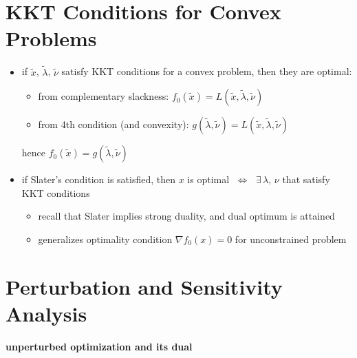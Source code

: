 \documentclass[11pt]{extarticle}
\newcommand{\ds}{\displaystyle}
\newcommand{\ifff}{\;\Longleftrightarrow\;}
\theoremstyle{definition}
\begin{document}
\newpage

\section*{KKT Conditions for Convex Problems}
\begin{itemize}
  \item if $\widetilde{x}$, $\widetilde{\lambda}$, $\widetilde{\nu}$ satisfy KKT conditions for a convex problem, then they are optimal:
    \begin{itemize}
      \item from complementary slackness: $\ds f_0(\widetilde{x}) = L(\widetilde{x}, \widetilde{\lambda}, \widetilde{\nu})$
      \item from 4th condition (and convexity): $\ds g(\widetilde{\lambda},\widetilde{\nu}) = L(\widetilde{x}, \widetilde{\lambda}, \widetilde{\nu})$ 
    \end{itemize}
    hence $\ds f_0(\widetilde{x}) = g(\widetilde{\lambda},\widetilde{\nu})$
  \item if Slater's condition is satisfied, then $x$ is optimal $\ifff$ $\exists\,\lambda,\,\nu$ that satisfy KKT conditions
    \begin{itemize}
      \item recall that Slater implies strong duality, and dual optimum is attained
      \item generalizes optimality condition $\ds\nabla f_0(x) = 0$ for unconstrained problem
    \end{itemize}
\end{itemize}

\newpage

\section*{Perturbation and Sensitivity Analysis}

{\bf unperturbed optimization and its dual} \\
  \begin{minipage}[t]{0.5\textwidth}\vspace{-5mm}
    \end{minipage}
    \begin{minipage}[t]{0.5\textwidth}\vspace{-5mm}
    \end{minipage}
\end{document}
